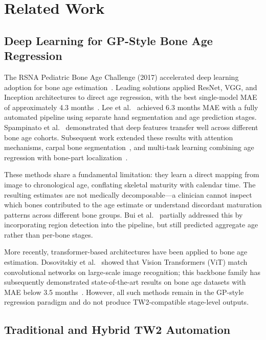 \documentclass[journal]{IEEEtran}
\begin{document}
\section{Related Work}
\label{sec:related}

\subsection{Deep Learning for GP-Style Bone Age Regression}

The RSNA Pediatric Bone Age Challenge (2017) accelerated deep
learning adoption for bone age estimation~\cite{halabi2019}.
Leading solutions applied ResNet, VGG, and Inception architectures
to direct age regression, with the best single-model MAE of
approximately 4.3 months~\cite{larson2018}.
Lee et al.~\cite{lee2017} achieved 6.3 months MAE with a fully
automated pipeline using separate hand segmentation and age
prediction stages.
Spampinato et al.~\cite{spampinato2017} demonstrated that deep
features transfer well across different bone age cohorts.
Subsequent work extended these results with attention mechanisms,
carpal bone segmentation~\cite{escobar2019}, and
multi-task learning combining age regression with bone-part
localization~\cite{cao2021,liu2019}.

These methods share a fundamental limitation: they learn a direct
mapping from image to chronological age, conflating skeletal
maturity with calendar time.
The resulting estimates are not medically decomposable—a clinician
cannot inspect which bones contributed to the age estimate or
understand discordant maturation patterns across different bone groups.
Bui et al.~\cite{bui2019} partially addressed this by incorporating
region detection into the pipeline, but still predicted aggregate age
rather than per-bone stages.

More recently, transformer-based architectures have been applied
to bone age estimation.
Dosovitskiy et al.~\cite{dosovitskiy2021} showed that Vision
Transformers (ViT) match convolutional networks on large-scale
image recognition; this backbone family has subsequently
demonstrated state-of-the-art results on bone age datasets with
MAE below 3.5 months~\cite{mutasa2020}.
However, all such methods remain in the GP-style regression paradigm
and do not produce TW2-compatible stage-level outputs.

\subsection{Traditional and Hybrid TW2 Automation}
\end{document}
